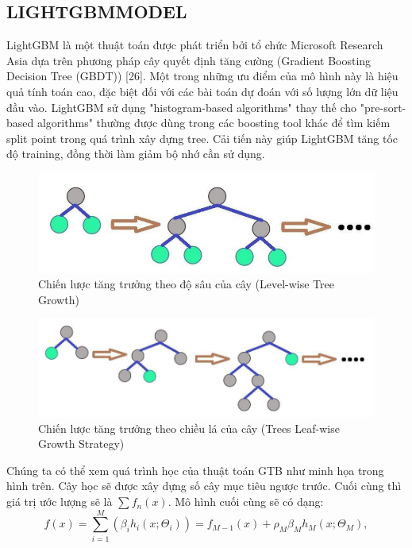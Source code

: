 \documentclass[conference]{IEEEtran}
\begin{document}
\subsection{LIGHTGBMMODEL}
LightGBM là một thuật toán được phát triển bởi tổ chức Microsoft Research Asia dựa trên phương pháp cây quyết định tăng cường (Gradient Boosting Decision Tree (GBDT)) [26]. Một trong những ưu điểm của mô hình này là hiệu quả tính toán cao, đặc biệt đối với các bài toán dự đoán với số lượng lớn dữ liệu đầu vào. LightGBM sử dụng "histogram-based algorithms" thay thế cho "pre-sort-based algorithms" thường được dùng trong các boosting tool khác để tìm kiếm split point trong quá trình xây dựng tree. Cải tiến này giúp LightGBM tăng tốc độ training, đồng thời làm giảm bộ nhớ cần sử dụng. 
\begin{figure}[H]
    \centering
    \begin{minipage}{0.5\textwidth}
    \centering
    \includegraphics[width=1\textwidth]{Image/Level-wise Tree Growth.png}
    \caption{Chiến lược tăng trưởng theo độ sâu của cây (Level-wise Tree Growth)}
    \label{fig:1}
    \end{minipage}
\end{figure}
\begin{figure}[H]
    \centering
    \begin{minipage}{0.5\textwidth}
    \centering
    \includegraphics[width=1\textwidth]{Image/Trees Leaf-wise Growth Strategy.png}
    \caption{Chiến lược tăng trưởng theo chiều lá của cây (Trees Leaf-wise Growth Strategy)}
    \label{fig:1}
    \end{minipage}
\end{figure}
Chúng ta có thể xem quá trình học của thuật toán GTB như minh họa trong hình trên. Cây học sẽ được xây dựng số cây mục tiêu ngược trước. Cuối cùng thì giá trị ước lượng sẽ là $\sum f_n(x)$. Mô hình cuối cùng sẽ có dạng:
\[
f(x) = \sum_{i=1}^{M} (\beta_i h_i (x; \Theta_i)) = f_{M-1}(x) + \rho_M \beta_M h_M (x; \Theta_M),
\]
\end{document}
